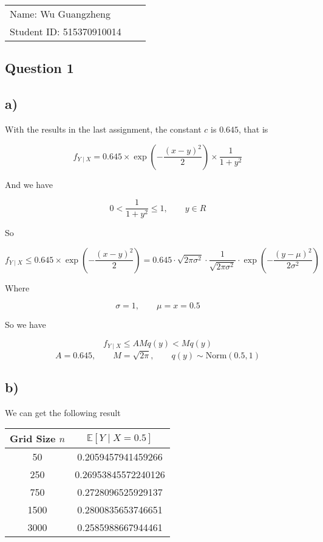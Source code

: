 \documentclass[12pt]{article}
\begin{document}
\vfill
\begin{large}

\begin{table}[h!]
\flushleft
\begin{tabular}{lll}
Name: Wu Guangzheng \hspace*{2em}\\
Student ID: 515370910014

\end{tabular}
\end{table}
\end{large}
\newpage
\begin{flushleft} 

\section{Question 1}

\subsection*{a)}

\qquad With the results in the last assignment, the constant $c$ is $0.645$, that is 

$$
f_{Y\mid X} = 0.645 \times \exp(-\frac{(x-y)^2}{2}) \times \frac{1}{1+y^2}
$$

\qquad And we have

$$
0 < \frac{1}{1+y^2} \leq 1, \qquad y \in R
$$

\qquad So 

$$
f_{Y\mid X} \leq 0.645 \times \exp(-\frac{(x-y)^2}{2}) = 0.645 \cdot \sqrt{2\pi \sigma^2} \cdot \frac{1}{\sqrt{2\pi \sigma^2}} \cdot \exp(-\frac{(y-\mu)^2}{2\sigma^2})
$$

\qquad Where

$$
\sigma = 1, \qquad \mu = x = 0.5
$$

\qquad So we have

$$
f_{Y\mid X} \leq AMq(y) < Mq(y)
$$
\vspace{-0.5cm}
$$
A = 0.645,  \qquad M = \sqrt{2\pi}, \qquad q(y) \sim \text{Norm}(0.5, 1)
$$

\subsection*{b)}

\qquad We can get the following result

\begin{table}[h]
\centering
\begin{tabular}{cc}
\hline
Grid Size $n$ & $\mathbb{E}\left[Y\mid X = 0.5\right]$ \\
\hline
50    &  0.2059457941459266  \\
250   &  0.26953845572240126 \\
750   &  0.2728096525929137  \\
1500  &  0.2800835653746651  \\
3000  &  0.2585988667944461  \\
\hline
\end{tabular}
\end{table}


\end{flushleft}
\end{document}
